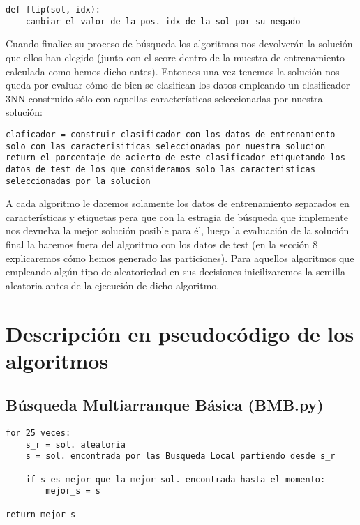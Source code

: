 \documentclass[10pt,a4paper]{article}
\begin{document}
\begin{lstlisting}
def flip(sol, idx):
	cambiar el valor de la pos. idx de la sol por su negado
\end{lstlisting}

Cuando finalice su proceso de búsqueda los algoritmos nos devolverán la solución que ellos han elegido (junto con el score dentro de la muestra de entrenamiento calculada como hemos dicho antes). Entonces una vez tenemos la solución nos queda por evaluar cómo de bien se clasifican los datos empleando un clasificador 3NN construido sólo con aquellas características seleccionadas por nuestra solución:\\

\begin{lstlisting}
claficador = construir clasificador con los datos de entrenamiento solo con las caracterisiticas seleccionadas por nuestra solucion
return el porcentaje de acierto de este clasificador etiquetando los datos de test de los que consideramos solo las caracteristicas seleccionadas por la solucion
\end{lstlisting}

A cada algoritmo le daremos solamente los datos de entrenamiento separados en características y etiquetas pera que con la estragia de búsqueda que implemente nos devuelva la mejor solución posible para él, luego la evaluación de la solución final la haremos fuera del algoritmo con los datos de test (en la sección 8 explicaremos cómo hemos generado las particiones). Para aquellos algoritmos que empleando algún tipo de aleatoriedad en sus decisiones inicilizaremos la semilla aleatoria antes de la ejecución de dicho algoritmo.	\\
\newpage

\section{\color[rgb]{0.0,0.0,0.21}Descripción en pseudocódigo de los algoritmos}
\subsection{\color[rgb]{0.0,0.0,0.51}Búsqueda Multiarranque Básica (BMB.py)}

\begin{lstlisting}
for 25 veces:
	s_r = sol. aleatoria
	s = sol. encontrada por las Busqueda Local partiendo desde s_r
	
	if s es mejor que la mejor sol. encontrada hasta el momento:
		mejor_s = s
		
return mejor_s
\end{lstlisting}
\end{document}
